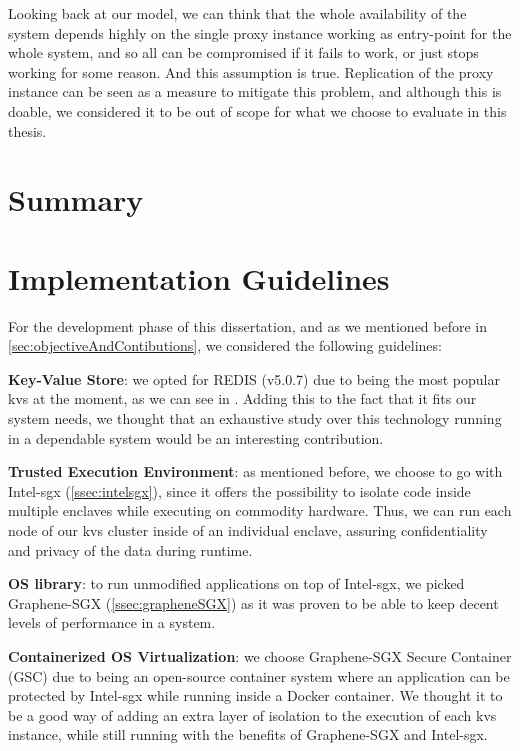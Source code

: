 Looking back at our model, we can think that the whole availability of the system depends highly on the single proxy instance working as entry-point for the whole system, and so all can be compromised if it fails to work, or just stops working for some reason. And this assumption is true. 
Replication of the proxy instance can be seen as a measure to mitigate this problem, and although this is doable, we considered it to be out of scope for what we choose to evaluate in this thesis. 



\section{Summary} %



\section{Implementation Guidelines} %

For the development phase of this dissertation, and as we mentioned before in \ref{sec:objectiveAndContibutions}, we considered the following guidelines:

\textbf{Key-Value Store}: we opted for REDIS (v5.0.7) due to being the most popular \gls{kvs} at the moment, as we can see in \cite{rankingKVStores}. Adding this to the fact that it fits our system needs, we thought that an exhaustive study over this technology running in a dependable system would be an interesting contribution.

\textbf{Trusted Execution Environment}: as mentioned before, we choose to go with Intel-\gls{sgx} (\ref{ssec:intelsgx}), since it offers the possibility to isolate code inside multiple enclaves while executing on commodity hardware. Thus, we can run each node of our \gls{kvs} cluster inside of an individual enclave, assuring confidentiality and privacy of the data during runtime.

\textbf{OS library}: to run unmodified applications on top of Intel-\gls{sgx}, we picked Graphene-SGX (\ref{ssec:grapheneSGX}) as it was proven to be able to keep decent levels of performance in a system.

\textbf{Containerized OS Virtualization}: we choose Graphene-SGX Secure Container (GSC) \cite{gsc} due to being an open-source container system where an application can be protected by Intel-\gls{sgx} while running inside a Docker \cite{docker} container. We thought it to be a good way of adding an extra layer of isolation to the execution of each \gls{kvs} instance, while still running with the benefits of Graphene-SGX and Intel-\gls{sgx}.

